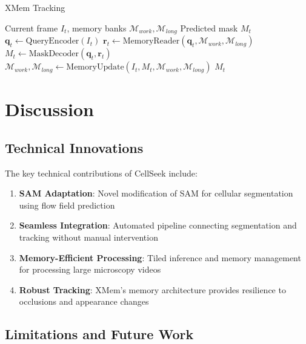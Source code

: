 \documentclass[12pt]{article}
\begin{document}
\begin{algorithm}[H]
  \caption{XMem Tracking}
  \begin{algorithmic}[1]
    \REQUIRE Current frame $I_t$, memory banks $\mathcal{M}_{work}, \mathcal{M}_{long}$
    \ENSURE Predicted mask $M_t$
    \STATE $\mathbf{q}_t \leftarrow \text{QueryEncoder}(I_t)$
    \STATE $\mathbf{r}_t \leftarrow \text{MemoryReader}(\mathbf{q}_t, \mathcal{M}_{work}, \mathcal{M}_{long})$
    \STATE $M_t \leftarrow \text{MaskDecoder}(\mathbf{q}_t, \mathbf{r}_t)$
    \STATE $\mathcal{M}_{work}, \mathcal{M}_{long} \leftarrow \text{MemoryUpdate}(I_t, M_t, \mathcal{M}_{work}, \mathcal{M}_{long})$
    \RETURN $M_t$
  \end{algorithmic}
\end{algorithm}

\section{Discussion}


\subsection{Technical Innovations}

The key technical contributions of CellSeek include:

\begin{enumerate}
  \item \textbf{SAM Adaptation}: Novel modification of SAM for cellular segmentation using flow field prediction
  \item \textbf{Seamless Integration}: Automated pipeline connecting segmentation and tracking without manual intervention
  \item \textbf{Memory-Efficient Processing}: Tiled inference and memory management for processing large microscopy videos
  \item \textbf{Robust Tracking}: XMem's memory architecture provides resilience to occlusions and appearance changes
\end{enumerate}

\subsection{Limitations and Future Work}
\end{document}
